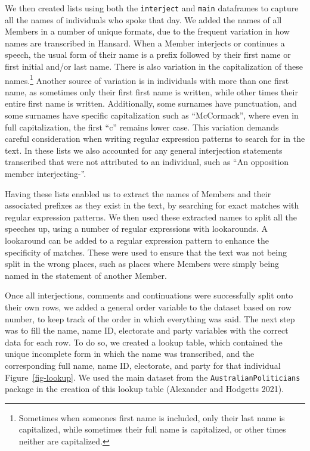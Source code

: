 \documentclass[
  letterpaper,
  DIV=11,
  numbers=noendperiod]{scrartcl}
\begin{document}
We then created lists using both the \texttt{interject} and
\texttt{main} dataframes to capture all the names of individuals who
spoke that day. We added the names of all Members in a number of unique
formats, due to the frequent variation in how names are transcribed in
Hansard. When a Member interjects or continues a speech, the usual form
of their name is a prefix followed by their first name or first initial
and/or last name. There is also variation in the capitalization of these
names.\footnote{Sometimes when someones first name is included, only
  their last name is capitalized, while sometimes their full name is
  capitalized, or other times neither are capitalized.} Another source
of variation is in individuals with more than one first name, as
sometimes only their first first name is written, while other times
their entire first name is written. Additionally, some surnames have
punctuation, and some surnames have specific capitalization such as
``McCormack'', where even in full capitalization, the first ``c''
remains lower case. This variation demands careful consideration when
writing regular expression patterns to search for in the text. In these
lists we also accounted for any general interjection statements
transcribed that were not attributed to an individual, such as ``An
opposition member interjecting-''.

Having these lists enabled us to extract the names of Members and their
associated prefixes as they exist in the text, by searching for exact
matches with regular expression patterns. We then used these extracted
names to split all the speeches up, using a number of regular
expressions with lookarounds. A lookaround can be added to a regular
expression pattern to enhance the specificity of matches. These were
used to ensure that the text was not being split in the wrong places,
such as places where Members were simply being named in the statement of
another Member.

Once all interjections, comments and continuations were successfully
split onto their own rows, we added a general order variable to the
dataset based on row number, to keep track of the order in which
everything was said. The next step was to fill the name, name ID,
electorate and party variables with the correct data for each row. To do
so, we created a lookup table, which contained the unique incomplete
form in which the name was transcribed, and the corresponding full name,
name ID, electorate, and party for that individual
Figure~\ref{fig-lookup}. We used the main dataset from the
\texttt{AustralianPoliticians} package in the creation of this lookup
table (Alexander and Hodgetts 2021).
\end{document}
